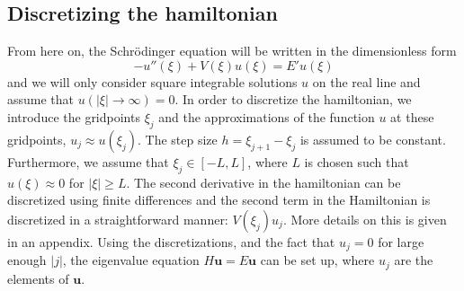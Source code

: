 \documentclass[twocolumn]{article}
\begin{document}
\begin{large}
\subsection*{Discretizing the hamiltonian}
From here on, the Schrödinger equation will be written in the dimensionless form
\begin{equation}
    \label{2apr1953}
    -u''(\xi) + V(\xi)u(\xi) = E'u(\xi)
\end{equation}
and we will only consider square integrable solutions $u$ on the real line and assume that $u(|\xi|\to\infty) = 0$. In order to discretize the hamiltonian, we introduce the gridpoints $\xi_j$ and the approximations of the function $u$ at these gridpoints, $u_j\approx u(\xi_j)$. The step size $h=\xi_{j+1}-\xi_j$ is assumed to be constant. Furthermore, we assume that $\xi_j\in[-L,L]$, where $L$ is chosen such that $u(\xi)\approx 0$ for $|\xi|\geq L$. The second derivative in the hamiltonian can be discretized using finite differences and the second term in the Hamiltonian is discretized in a straightforward manner: $V(\xi_j)u_j$. More details on this is given in an appendix. Using the discretizations, and the fact that $u_j=0$ for large enough $|j|$, the eigenvalue equation $H\mathbf{u} = E\mathbf{u}$ can be set up, where $u_j$ are the elements of $\mathbf{u}$. 


\end{large}
\end{document}

